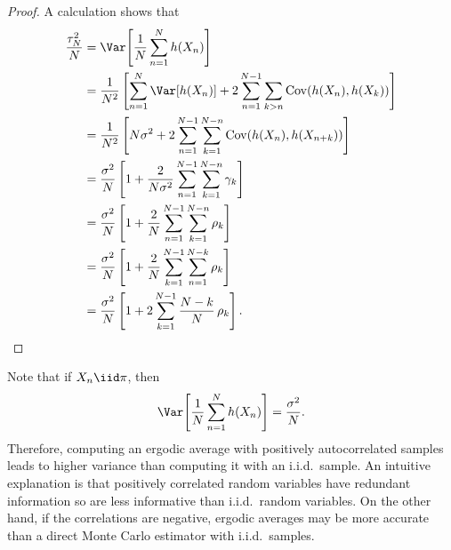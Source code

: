 \begin{proof}
A calculation shows that
\begin{align*}
  \frac{\tau_N^2}{N}
    &= \Var\!\left[\frac{1}{N}\sum_{n=1}^{N} h(X_n)\right] \\
    &= \frac{1}{N^2}\left[\sum_{n=1}^{N} \Var[h(X_n)]
       + 2\sum_{n=1}^{N-1}\sum_{k>n} \mathrm{Cov}(h(X_n), h(X_k))\right] \\
    &= \frac{1}{N^2}\left[N\sigma^2
       + 2\sum_{n=1}^{N-1}\sum_{k=1}^{N-n} \mathrm{Cov}(h(X_n), h(X_{n+k}))\right] \\
    &= \frac{\sigma^2}{N}\left[1
       + \frac{2}{N\sigma^2}\sum_{n=1}^{N-1}\sum_{k=1}^{N-n} \gamma_k\right] \\
    &= \frac{\sigma^2}{N}\left[1
       + \frac{2}{N}\sum_{n=1}^{N-1}\sum_{k=1}^{N-n} \rho_k\right] \\
    &= \frac{\sigma^2}{N}\left[1
       + \frac{2}{N}\sum_{k=1}^{N-1}\sum_{n=1}^{N-k} \rho_k\right] \\
    &= \frac{\sigma^2}{N}\left[1
       + 2\sum_{k=1}^{N-1} \frac{N-k}{N}\,\rho_k\right]. \qedhere
\end{align*}
\end{proof}

Note that if $X_n \iid \pi$, then
\[
  \Var\!\left[\frac{1}{N}\sum_{n=1}^{N} h(X_n)\right] = \frac{\sigma^2}{N}.
\]
Therefore, computing an ergodic average with positively autocorrelated samples leads to higher
variance than computing it with an i.i.d.\ sample.  An intuitive explanation is that positively
correlated random variables have redundant information so are less informative than i.i.d.\ random
variables.  On the other hand, if the correlations are negative, ergodic averages may be more
accurate than a direct Monte Carlo estimator with i.i.d.\ samples.
